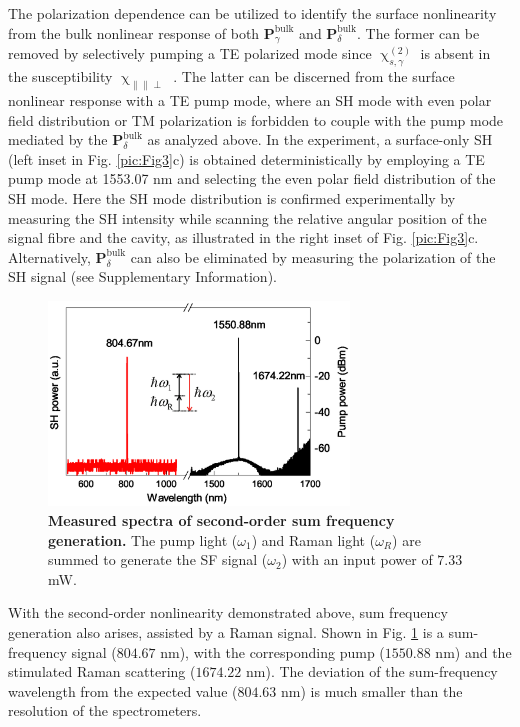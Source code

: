 \documentclass[a4paper,8pt,hyperref, twocolumn, aps, prl]{article}
\begin{document}
The polarization dependence can be utilized to identify the surface nonlinearity from the bulk nonlinear response of both $\mathbf{P}^{\mathrm{bulk}}_\gamma$ and $\mathbf{P}^{\mathrm{bulk}}_\delta$.
The former can be removed by selectively pumping a TE polarized mode since $\upchi^{(2)}_{s,\gamma}$ is absent in the susceptibility $\upchi_{\parallel \parallel \perp}$ \cite{heinz1991second}.
The latter can be discerned from the surface nonlinear response with a TE pump mode, where an SH mode with even polar field distribution or TM polarization is forbidden to couple with the pump mode mediated by the $\mathbf{P}^{\mathrm{bulk}}_\delta$ as analyzed above.
In the experiment, a surface-only SH (left inset in Fig. \ref{pic:Fig3}c) is obtained deterministically by employing a TE pump mode at 1553.07 nm and selecting the even polar field distribution of the SH mode. %
Here the SH mode distribution is confirmed experimentally by measuring the SH intensity while scanning the relative angular position of the signal fibre and the cavity, as illustrated in the right inset of Fig. \ref{pic:Fig3}c.
Alternatively, $\mathbf{P}^{\mathrm{bulk}}_\delta$ can also be eliminated by measuring the polarization of the SH signal (see Supplementary Information).

\begin{figure}[!ht]
\centering
\includegraphics[width=8cm]{Fig4.eps}
\caption{\textbf{Measured spectra of second-order sum frequency generation. }The pump light ($\omega_1$) and Raman light ($\omega_R$) are summed to generate the SF signal ($\omega_2$) with an input power of $7.33$ mW.}
\label{pic:Fig4}
\end{figure}

With the second-order nonlinearity demonstrated above, sum frequency generation also arises, assisted by a Raman signal.
Shown in Fig. \ref{pic:Fig4} is a sum-frequency signal ($804.67$ nm), with the corresponding pump ($1550.88$ nm) and the stimulated Raman scattering ($1674.22$ nm).
The deviation of the sum-frequency wavelength from the expected value ($804.63$ nm) is much smaller than the resolution of the spectrometers.
\end{document}
